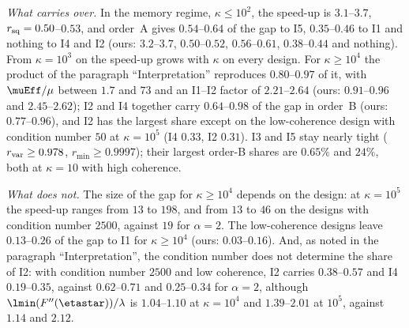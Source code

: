 \emph{What carries over.} In the memory regime, $\kappa\le10^2$, the speed-up is $3.1$--$3.7$, $r_{\rm sq}=0.50$--$0.53$,
and order~A gives $0.54$--$0.64$ of the gap to I5, $0.35$--$0.46$ to I1 and nothing to I4 and I2 (ours: $3.2$--$3.7$,
$0.50$--$0.52$, $0.56$--$0.61$, $0.38$--$0.44$ and nothing). From $\kappa=10^3$ on the speed-up grows with $\kappa$ on every
design. For $\kappa\ge10^4$ the product of the paragraph ``Interpretation'' reproduces $0.80$--$0.97$ of it, with
$\muEff/\mu$ between $1.7$ and $73$ and an I1--I2 factor of $2.21$--$2.64$ (ours: $0.91$--$0.96$ and $2.45$--$2.62$); I2 and
I4 together carry $0.64$--$0.98$ of the gap in order~B (ours: $0.77$--$0.96$), and I2 has the largest share except on the
low-coherence design with condition number $50$ at $\kappa=10^5$ (I4 $0.33$, I2 $0.31$). I3 and I5 stay nearly tight
($r_{\rm var}\ge0.978$, $r_{\min}\ge0.9997$); their largest order-B shares are $0.65\%$ and $24\%$, both at $\kappa=10$ with
high coherence.

\emph{What does not.} The size of the gap for $\kappa\ge10^4$ depends on the design: at $\kappa=10^5$ the speed-up ranges
from $13$ to $198$, and from $13$ to $46$ on the designs with condition number $2500$, against $19$ for $\alpha=2$. The
low-coherence designs leave $0.13$--$0.26$ of the gap to I1 for $\kappa\ge10^4$ (ours: $0.03$--$0.16$). And, as noted in
the paragraph ``Interpretation'', the condition number does not determine the share of I2: with condition number $2500$
and low coherence, I2 carries $0.38$--$0.57$ and I4 $0.19$--$0.35$, against $0.62$--$0.71$ and $0.25$--$0.34$ for
$\alpha=2$, although $\lmin(F''(\etastar))/\lambda$ is $1.04$--$1.10$ at $\kappa=10^4$ and $1.39$--$2.01$ at $10^5$, against
$1.14$ and $2.12$.

